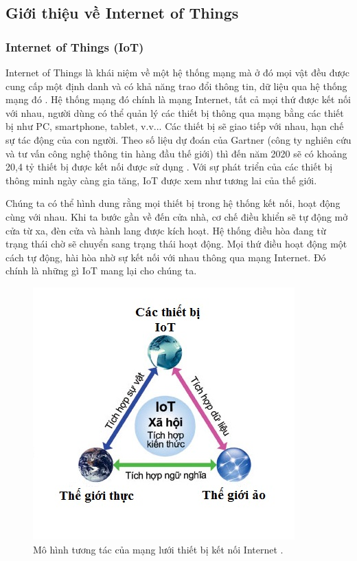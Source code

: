 \documentclass[a4paper,12pt,oneside]{article}
\begin{document}
\subsection{Giới thiệu về Internet of Things}

\subsubsection{Internet of Things (IoT)}

\noindent Internet of Things là khái niệm về một hệ thống mạng mà ở đó mọi vật đều được cung cấp một định danh và có khả năng trao đổi thông tin, dữ liệu qua hệ thống mạng đó \cite{iot}. Hệ thống mạng đó chính là mạng Internet, tất cả mọi thứ được kết nối với nhau, người dùng có thể quản lý các thiết bị thông qua mạng bằng các thiết bị như PC, smartphone, tablet, v.v... Các thiết bị sẽ giao tiếp với nhau, hạn chế sự tác động của con người. Theo số liệu dự đoán của Gartner (công ty nghiên cứu và tư vấn công nghệ thông tin hàng đầu thế giới) thì đến năm 2020 sẽ có khoảng 20,4 tỷ thiết bị được kết nối được sử dụng \cite{gartner}. Với sự phát triển của các thiết bị thông minh ngày càng gia tăng, IoT được xem như tương lai của thế giới.

\noindent Chúng ta có thể hình dung rằng mọi thiết bị trong hệ thống kết nối, hoạt động cùng với nhau. Khi ta bước gần về đến cửa nhà, cơ chế điều khiển sẽ tự động mở cửa từ xa, đèn cửa và hành lang được kích hoạt. Hệ thống điều hòa đang từ trạng thái chờ sẽ chuyển sang trạng thái hoạt động. Mọi thứ điều hoạt động một cách tự động, hài hòa nhờ sự kết nối với nhau thông qua mạng Internet. Đó chính là những gì IoT mang lại cho chúng ta.

\begin{figure}[H]
\centering
\includegraphics[scale=.7]{hinh/IoT_intro.jpg}
\caption{Mô hình tương tác của mạng lưới thiết bị kết nối Internet \cite{iot}.}
\end{figure}
\end{document}

